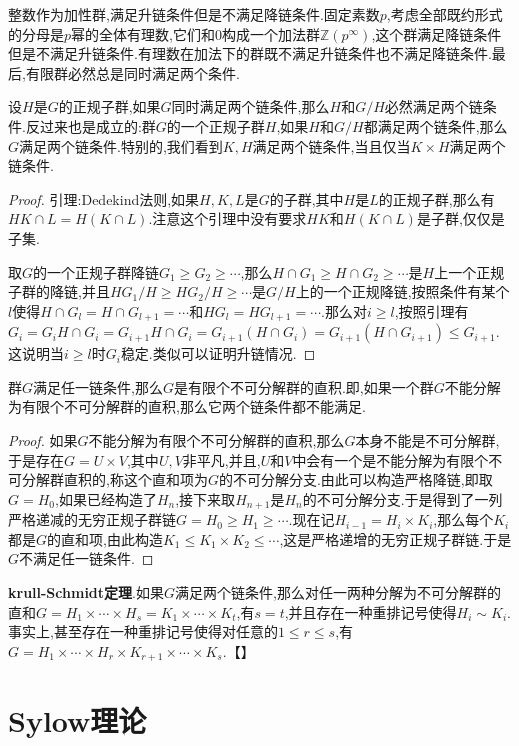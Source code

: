 整数作为加性群,满足升链条件但是不满足降链条件.固定素数$p$,考虑全部既约形式的分母是$p$幂的全体有理数,它们和0构成一个加法群$\mathbb{Z}(p^{\infty})$,这个群满足降链条件但是不满足升链条件.有理数在加法下的群既不满足升链条件也不满足降链条件.最后,有限群必然总是同时满足两个条件.

设$H$是$G$的正规子群,如果$G$同时满足两个链条件,那么$H$和$G/H$必然满足两个链条件.反过来也是成立的:群$G$的一个正规子群$H$,如果$H$和$G/H$都满足两个链条件,那么$G$满足两个链条件.特别的,我们看到$K,H$满足两个链条件,当且仅当$K\times H$满足两个链条件.
\begin{proof}
	
	引理:Dedekind法则,如果$H,K,L$是$G$的子群,其中$H$是$L$的正规子群,那么有$HK\cap L=H(K\cap L)$.注意这个引理中没有要求$HK$和$H(K\cap L)$是子群,仅仅是子集.
	
	取$G$的一个正规子群降链$G_1\ge G_2\ge\cdots$,那么$H\cap G_1\ge H\cap G_2\ge\cdots$是$H$上一个正规子群的降链,并且$HG_1/H\ge HG_2/H\ge\cdots$是$G/H$上的一个正规降链,按照条件有某个$l$使得$H\cap G_l=H\cap G_{l+1}=\cdots$和$HG_l=HG_{l+1}=\cdots$.那么对$i\ge l$,按照引理有$G_i=G_iH\cap G_i=G_{i+1}H\cap G_i=G_{i+1}(H\cap G_i)=G_{i+1}(H\cap G_{i+1})\le G_{i+1}$.这说明当$i\ge l$时$G_i$稳定.类似可以证明升链情况.
\end{proof}

群$G$满足任一链条件,那么$G$是有限个不可分解群的直积.即,如果一个群$G$不能分解为有限个不可分解群的直积,那么它两个链条件都不能满足.
\begin{proof}
	
	如果$G$不能分解为有限个不可分解群的直积,那么$G$本身不能是不可分解群,于是存在$G=U\times V$,其中$U,V$非平凡,并且,$U$和$V$中会有一个是不能分解为有限个不可分解群直积的,称这个直和项为$G$的不可分解分支.由此可以构造严格降链,即取$G=H_0$,如果已经构造了$H_n$,接下来取$H_{n+1}$是$H_n$的不可分解分支.于是得到了一列严格递减的无穷正规子群链$G=H_0\ge H_1\ge\cdots$.现在记$H_{i-1}=H_i\times K_i$,那么每个$K_i$都是$G$的直和项,由此构造$K_1\le K_1\times K_2\le\cdots$,这是严格递增的无穷正规子群链.于是$G$不满足任一链条件.
\end{proof}

\textbf{krull-Schmidt定理}.如果$G$满足两个链条件,那么对任一两种分解为不可分解群的直和$G=H_1\times\cdots\times H_s=K_1\times\cdots\times K_t$,有$s=t$,并且存在一种重排记号使得$H_i\sim K_i$.事实上,甚至存在一种重排记号使得对任意的$1\le r\le s$,有$G=H_1\times\cdots\times H_r\times K_{r+1}\times\cdots\times K_s$.【】
\newpage
\section{Sylow理论}
